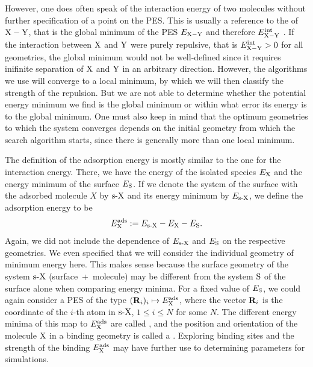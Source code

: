 \documentclass[8.5pt,twoside,twocolumn]{article}
\newcommand\eint{\enmat{E^{\te{int}}}}
\newcommand\eads{\enmat{E^{\te{ads}}}}
\theoremstyle{standard}
\begin{document}
However, one does often speak of the interaction energy of two molecules without further specification
of a point on the PES. This is usually a reference to the 
of $\XY$, that is the global minimum of the PES $E_{\XY}$ and therefore
$\eint_\XY$ . If the interaction between $\X$ and $\Y$ were purely repulsive,
that is $\eint_{\XY} > 0$ for all geometries, the global minimum would not be
well-defined since it requires inifinite separation of $\X$ and $\Y$ in an
arbitrary direction.
However, the algorithms we use will converge to a local minimum, by which we
will then classify the strength of the repulsion. But we are not able to
determine whether the potential energy minimum we find is the global minimum or
within what error its energy is to the global minimum. One must also keep in
mind that the optimum geometries to which the system converges depends on the
initial geometry from which the search algorithm starts, since there is
generally more than one local minimum.

The definition of the adsorption energy is mostly similar to the one
for the interaction energy.
There, we have the energy of the isolated species $E_\X$ and the energy minimum of the
surface $E_{\S}$. If we denote the system of the surface with the adsorbed
molecule $X$ by $\sX$ and its energy minimum by $E_{\sX}$, we define the
adsorption energy to be
\begin{equation}
 \eads_{\X}:= E_{\sX} - E_\X - E_\S.
 \label{Theo:AdsorptionEnergy}
\end{equation}
Again, we did not include the dependence of $E_\sX$ and $E_\S$ on the respective
geometries. We even specified that we will consider the individual geometry of
minimum energy here. This makes sense because the surface geometry of the system
$\sX$ \mbox{(surface + molecule)} may be different from the system $\S$ of the
surface alone when comparing energy minima. For a fixed value of $E_\S$, we
could again consider a PES of the type \mbox{$(\bo R_i)_i \mapsto \eads_\X$},
where the vector $\bo R_i$ is the coordinate of the $i$-th atom in $\sX$, $1 \le
i \le N$ for some $N$. The different energy minima of this map to $\eads_\X$ are
called , and the position and orientation of the
molecule $\X$ in a binding geometry is called a .
Exploring binding sites and the strength of the binding $\eads_\X$ may have
further use to determining parameters for simulations.
\end{document}
